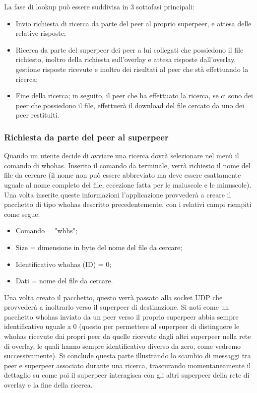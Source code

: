 La fase di lookup può essere suddivisa in 3 sottofasi principali:\linebreak
\begin{itemize}
\item Invio richiesta di ricerca da parte del peer al proprio superpeer, e attesa delle relative risposte;
\item Ricerca da parte del superpeer dei peer a lui collegati che possiedono il file richiesto, inoltro della richiesta sull'overlay e attesa risposte dall'overlay, gestione risposte ricevute e inoltro dei risultati al peer che stà effettuando la ricerca;
\item Fine della ricerca; in seguito, il peer che ha effettuato la ricerca, se ci sono dei peer che possiedono il file, effettuerà il download del file cercato da uno dei peer restituiti.
\end{itemize}

\subsubsection{Richiesta da parte del peer al superpeer}
Quando un utente decide di avviare una ricerca dovrà selezionare nel menù il comando di whohas. Inserito il comando da terminale, verrà richiesto il nome del file da cercare (il nome non può essere abbreviato ma deve essere esattamente uguale al nome completo del file, eccezione fatta per le maiuscole e le minuscole). Una volta inserite queste informazioni l'applicazione provvederà a creare il pacchetto di tipo whohas descritto precedentemente, con i relativi campi riempiti come segue:\linebreak
\begin{itemize}
\item Comando = "whhs";
\item Size = dimensione in byte del nome del file da cercare;
\item Identificativo whohas (ID) = 0;
\item Dati = nome del file da cercare.
\end{itemize}
Una volta creato il pacchetto, questo verrà passato alla socket UDP che provvederà a inoltrarlo verso il superpeer di destinazione. Si noti come un pacchetto whohas inviato da un peer verso il proprio superpeer abbia sempre identificativo uguale a 0 (questo per permettere al superpeer di distinguere le whohas ricevute dai propri peer da quelle ricevute dagli altri superpeer nella rete di overlay, le quali hanno sempre identificativo diverso da zero, come vedremo successivamente). Si conclude questa parte illustrando lo scambio di messaggi tra peer e superpeer associato durante una ricerca, trascurando momentaneamente il dettaglio su come poi il superpeer interagisca con gli altri superpeer della rete di overlay e la fine della ricerca.

